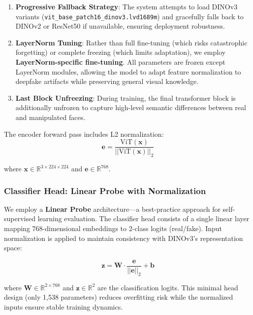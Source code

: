 \documentclass[11pt,a4paper]{article}
\begin{document}
\begin{enumerate}
    \item \textbf{Progressive Fallback Strategy}: The system attempts to load DINOv3 variants (\texttt{vit\_base\_patch16\_dinov3.lvd1689m}) and gracefully falls back to DINOv2 or ResNet50 if unavailable, ensuring deployment robustness.
    
    \item \textbf{LayerNorm Tuning}: Rather than full fine-tuning (which risks catastrophic forgetting) or complete freezing (which limits adaptation), we employ \textbf{LayerNorm-specific fine-tuning}. All parameters are frozen except LayerNorm modules, allowing the model to adapt feature normalization to deepfake artifacts while preserving general visual knowledge.
    
    \item \textbf{Last Block Unfreezing}: During training, the final transformer block is additionally unfrozen to capture high-level semantic differences between real and manipulated faces.
\end{enumerate}

The encoder forward pass includes L2 normalization:
\begin{equation}
    \mathbf{e} = \frac{\text{ViT}(\mathbf{x})}{||\text{ViT}(\mathbf{x})||_2}
\end{equation}

where $\mathbf{x} \in \mathbb{R}^{3 \times 224 \times 224}$ and $\mathbf{e} \in \mathbb{R}^{768}$.

\subsubsection{Classifier Head: Linear Probe with Normalization}

We employ a \textbf{Linear Probe} architecture---a best-practice approach for self-supervised learning evaluation. The classifier head consists of a single linear layer mapping 768-dimensional embeddings to 2-class logits (real/fake). Input normalization is applied to maintain consistency with DINOv3's representation space:

\begin{equation}
    \mathbf{z} = \mathbf{W} \cdot \frac{\mathbf{e}}{||\mathbf{e}||_2} + \mathbf{b}
\end{equation}

where $\mathbf{W} \in \mathbb{R}^{2 \times 768}$ and $\mathbf{z} \in \mathbb{R}^2$ are the classification logits. This minimal head design (only 1,538 parameters) reduces overfitting risk while the normalized inputs ensure stable training dynamics.
\end{document}
